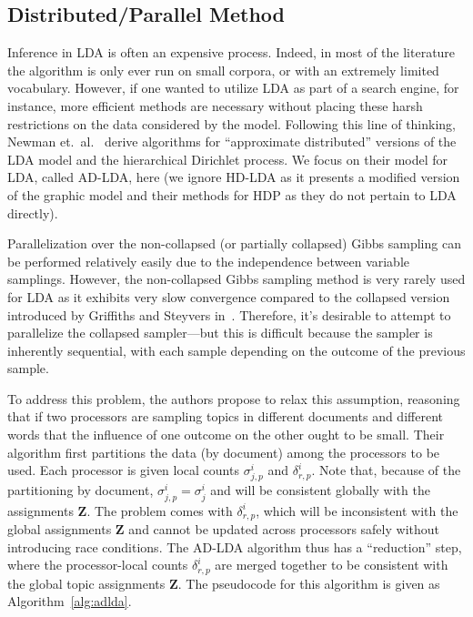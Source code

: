 \documentclass[11pt]{article}
\begin{document}
\subsection{Distributed/Parallel Method}

Inference in LDA is often an expensive process. Indeed, in most of the
literature the algorithm is only ever run on small corpora, or with an
extremely limited vocabulary. However, if one wanted to utilize LDA as part
of a search engine, for instance, more efficient methods are necessary
without placing these harsh restrictions on the data considered by the
model. Following this line of thinking, Newman et.\
al.~\cite{Newman:2009:ADLDA} derive algorithms for ``approximate
distributed'' versions of the LDA model and the hierarchical Dirichlet
process. We focus on their model for LDA, called AD-LDA, here (we ignore
HD-LDA as it presents a modified version of the graphic model and their
methods for HDP as they do not pertain to LDA directly).

Parallelization over the non-collapsed (or partially collapsed) Gibbs
sampling can be performed relatively easily due to the independence between
variable samplings. However, the non-collapsed Gibbs sampling method is
very rarely used for LDA as it exhibits very slow convergence compared to
the collapsed version introduced by Griffiths and
Steyvers in~\cite{Griffiths:2004:Topics}. Therefore, it's desirable to
attempt to parallelize the collapsed sampler---but this is difficult
because the sampler is inherently sequential, with each sample depending on
the outcome of the previous sample.

To address this problem, the authors propose to relax this assumption,
reasoning that if two processors are sampling topics in different documents
and different words that the influence of one outcome on the other ought to
be small. Their algorithm first partitions the data (by document) among the
processors to be used. Each processor is given local counts
$\sigma_{j,p}^i$ and $\delta_{r,p}^i$. Note that, because of the
partitioning by document, $\sigma_{j,p}^i = \sigma_j^i$ and will be
consistent globally with the assignments $\mathbf{Z}$. The problem comes
with $\delta_{r,p}^i$, which will be inconsistent with the global
assignments $\mathbf{Z}$ and cannot be updated across processors safely
without introducing race conditions. The AD-LDA algorithm thus has a
``reduction'' step, where the processor-local counts $\delta_{r,p}^i$ are
merged together to be consistent with the global topic assignments
$\mathbf{Z}$. The pseudocode for this algorithm is given as
Algorithm~\ref{alg:adlda}.
\end{document}
